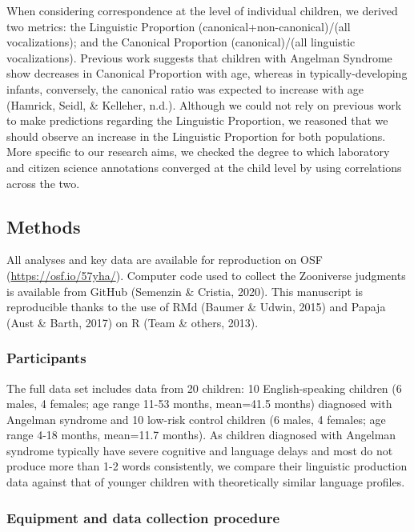 \documentclass[english,,man,floatsintext]{apa6}
\begin{document}
When considering correspondence at the level of individual children, we derived two metrics: the Linguistic Proportion (canonical+non-canonical)/(all vocalizations); and the Canonical Proportion (canonical)/(all linguistic vocalizations). Previous work suggests that children with Angelman Syndrome show decreases in Canonical Proportion with age, whereas in typically-developing infants, conversely, the canonical ratio was expected to increase with age (Hamrick, Seidl, \& Kelleher, n.d.). Although we could not rely on previous work to make predictions regarding the Linguistic Proportion, we reasoned that we should observe an increase in the Linguistic Proportion for both populations. More specific to our research aims, we checked the degree to which laboratory and citizen science annotations converged at the child level by using correlations across the two.

\hypertarget{methods}{%
\subsection{Methods}\label{methods}}

All analyses and key data are available for reproduction on OSF (\url{https://osf.io/57yha/}). Computer code used to collect the Zooniverse judgments is available from GitHub (Semenzin \& Cristia, 2020). This manuscript is reproducible thanks to the use of RMd (Baumer \& Udwin, 2015) and Papaja (Aust \& Barth, 2017) on R (Team \& others, 2013).

\hypertarget{participants}{%
\subsubsection{Participants}\label{participants}}

The full data set includes data from 20 children: 10 English-speaking children (6 males, 4 females; age range 11-53 months, mean=41.5 months) diagnosed with Angelman syndrome and 10 low-risk control children (6 males, 4 females; age range 4-18 months, mean=11.7 months). As children diagnosed with Angelman syndrome typically have severe cognitive and language delays and most do not produce more than 1-2 words consistently, we compare their linguistic production data against that of younger children with theoretically similar language profiles.

\hypertarget{equipment-and-data-collection-procedure}{%
\subsubsection{Equipment and data collection procedure}\label{equipment-and-data-collection-procedure}}
\end{document}
